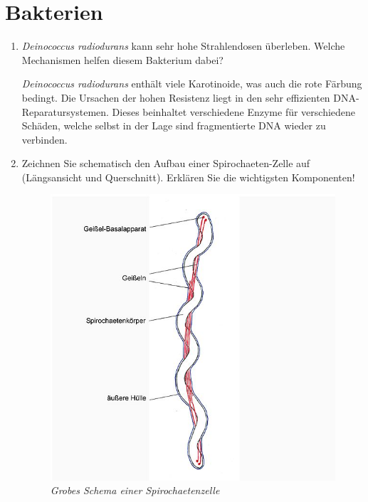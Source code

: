 \newpage
\section{Bakterien}
\begin{enumerate}
	\item \emph{Deinococcus radiodurans} kann sehr hohe Strahlendosen überleben. Welche Mechanismen helfen diesem Bakterium dabei?
		
		\emph{Deinococcus radiodurans} enthält viele Karotinoide,
		was auch die rote Färbung bedingt.
		Die Ursachen der hohen Resistenz liegt in den sehr effizienten DNA-Reparatursystemen.
		Dieses beinhaltet verschiedene Enzyme für verschiedene Schäden,
		welche selbst in der Lage sind fragmentierte DNA wieder zu verbinden.

	\item Zeichnen Sie schematisch den Aufbau einer Spirochaeten-Zelle auf (Längsansicht und Querschnitt). Erklären Sie die wichtigsten Komponenten!
		
		\begin{figure}[ht!]
		\begin{center}
		\includegraphics[scale=0.42]{./pictures/schema_spiro_596}
		\end{center}
		\caption{\slshape{Grobes Schema einer Spirochaetenzelle}}
		\label{fig:spiroschema}
		\end{figure}
			

\end{enumerate}
